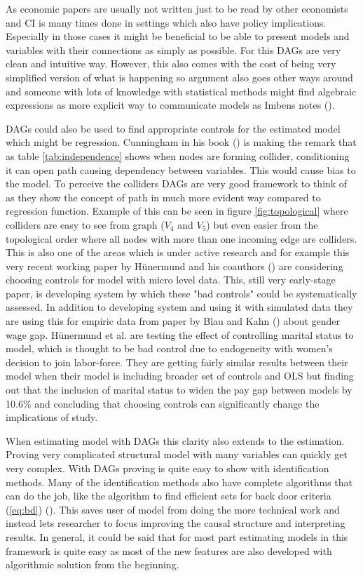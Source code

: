 \documentclass[main=english,12pt,a4paper,pdftex,econ,utf8]{aaltothesis}
\begin{document}
As economic papers are usually not written just to be read by other economists and CI is many times done in settings which also have policy implications. Especially in those cases it might be beneficial to be able to present models and variables with their connections as simply as possible. For this DAGs are very clean and intuitive way. However, this also comes with the cost of being very simplified version of what is happening so argument also goes other ways around and someone with lots of knowledge with statistical methods might find algebraic expressions as more explicit way to communicate models as Imbens notes (\cite{imbes2020}).

DAGs could also be used to find appropriate controls for the estimated model which might be regression. Cunningham in his book (\cite{Cunningham2021}) is making the remark that as table \ref{tab:independence} shows when nodes are forming collider, conditioning it can open path causing dependency between variables. This would cause bias to the model. To perceive the colliders DAGs are very good  framework to think of as they show the concept of path in much more evident way compared to regression function. Example of this can be seen in figure \ref{fig:topological} where colliders are easy to see from graph ($V_{4}$ and $V_{5}$) but even easier from the topological order where all nodes with more than one incoming edge are colliders. This is also one of the areas which is under active research and for example this very recent working paper by Hünermund and his coauthors (\cite{Hunermund2021}) are considering choosing controls for model with micro level data. This, still very early-stage paper, is developing system by which these "bad controls" could be systematically assessed. In addition to developing system and using it with simulated data they are using this for empiric data from paper by Blau and Kahn (\cite{Blau2017}) about gender wage gap. Hünermund et al. are testing the effect of controlling marital status to model, which is thought to be bad control due to endogeneity with women's decision to join labor-force. They are getting fairly similar results between their model when their model is including broader set of controls and OLS but finding out that the inclusion of marital status to widen the pay gap between models by 10.6\% and concluding that choosing controls can significantly change the implications of study.

When estimating model with DAGs this clarity also extends to the estimation. Proving very complicated structural model with many variables can quickly get very complex. With DAGs proving is quite easy to show with identification methods. Many of the identification methods also have complete algorithms that can do the job, like the algorithm to find efficient sets for back door criteria (\ref{eq:bd}) (\cite{Correa2017}). This saves user of model from doing the more technical work and instead lets researcher to focus improving the causal structure and interpreting results. In general, it could be said that for most part estimating models in this framework is quite easy as most of the new features are also developed with algorithmic solution from the beginning.
\end{document}
